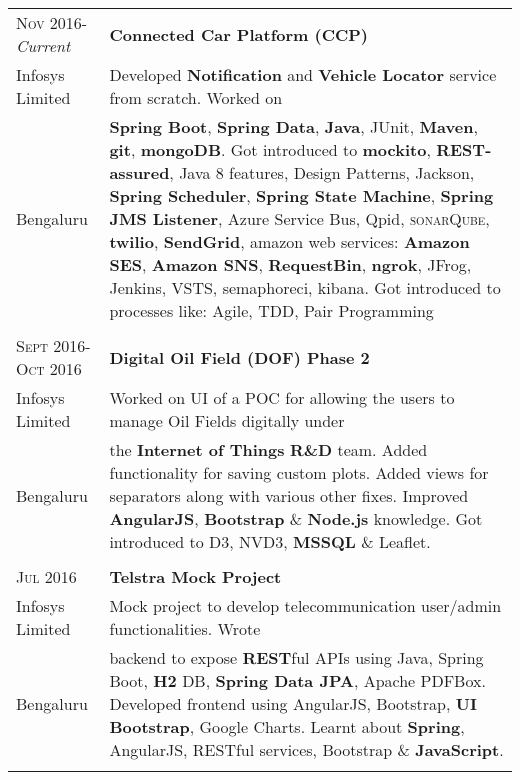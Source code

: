 \documentclass[a4paper,10pt]{article} %
\begin{document}
\begin{tabular}{l|p{11cm}}
\textsc{Nov 2016-}\emph{Current} & \textbf{Connected Car Platform (CCP)} \\
Infosys Limited & \footnotesize{Developed \textbf{Notification} and \textbf{Vehicle Locator} service from scratch. Worked on}\\ 
Bengaluru & \footnotesize{\textbf{Spring Boot}, \textbf{Spring Data}, \textbf{Java}, JUnit, \textbf{Maven}, \textbf{git}, \textbf{mongoDB}. Got introduced to \textbf{mockito}, \textbf{REST-assured}, Java 8 features, Design Patterns, Jackson, \textbf{Spring Scheduler}, \textbf{Spring State Machine}, \textbf{Spring JMS Listener}, Azure Service Bus, Qpid, \textsc{sonar}Q\textsc{ube}, \textbf{twilio}, \textbf{SendGrid}, amazon web services: \textbf{Amazon SES}, \textbf{Amazon SNS}, \textbf{RequestBin}, \textbf{ngrok}, JFrog, Jenkins, VSTS, semaphoreci, kibana. Got introduced to processes like: Agile, TDD, Pair Programming}\\
\multicolumn{2}{c}{} \\


\textsc{Sept 2016-Oct 2016} & \textbf{Digital Oil Field (DOF) Phase 2}\emph{}\\
Infosys Limited & \footnotesize{Worked on UI of a POC for allowing the users to manage Oil Fields digitally under}\\
Bengaluru & \footnotesize{the \textbf{Internet of Things} \textbf{R\&D} team. Added functionality for saving custom plots. Added views for separators along with various other fixes. Improved \textbf{AngularJS}, \textbf{Bootstrap} \& \textbf{Node.js} knowledge. Got introduced to D3, NVD3, \textbf{MSSQL} \& Leaflet.}\\
\multicolumn{2}{c}{} \\


\textsc{Jul 2016} & \textbf{Telstra Mock Project} \emph{}\\
Infosys Limited & \footnotesize{Mock project to develop telecommunication user/admin functionalities. Wrote}\\
Bengaluru & \footnotesize{backend to expose \textbf{REST}ful APIs using Java, Spring Boot, \textbf{H2} DB, \textbf{Spring Data JPA}, Apache PDFBox. Developed frontend using AngularJS, Bootstrap, \textbf{UI Bootstrap}, Google Charts. Learnt about \textbf{Spring}, AngularJS, RESTful services, Bootstrap \& \textbf{JavaScript}.}\\
\multicolumn{2}{c}{} \\


\end{tabular}
\end{document}
